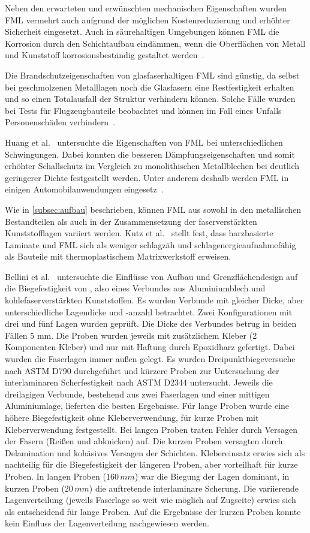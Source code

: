Neben den erwarteten und erwünschten mechanischen Eigenschaften wurden FML vermehrt auch aufgrund der möglichen Kostenreduzierung und erhöhter Sicherheit eingesetzt.
Auch in säurehaltigen Umgebungen können FML die Korrosion durch den Schichtaufbau eindämmen, wenn die Oberflächen von Metall und Kunststoff korrosionsbeständig gestaltet werden~\cite{Vogelesang2000}.

Die Brandschutzeigenschaften von glasfaserhaltigen FML sind günstig, da selbst bei geschmolzenen Metalllagen noch die Glasfasern eine Restfestigkeit erhalten und so einen Totalausfall der Struktur verhindern können.
Solche Fälle wurden bei Tests für Flugzeugbauteile beobachtet und können im Fall eines Unfalls Personenschäden verhindern~\cite{Vogelesang2000}.

Huang et al.~\cite{Huang1995} untersuchte die Eigenschaften von FML bei unterschiedlichen Schwingungen.
Dabei konnten die besseren Dämpfungseigenschaften und somit erhöhter Schallschutz im Vergleich zu monolithischen Metallblechen bei deutlich geringerer Dichte festgestellt werden.
Unter anderem deshalb werden FML in einigen Automobilanwendungen eingesetz~\cite{Ruokolainen2008}.

Wie in \autoref{subsec:aufbau} beschrieben, können FML aus sowohl in den metallischen Bestandteilen als auch in der Zusammensetzung der faserverstärkten Kunststofflagen variiert werden.
Kutz et al.~\cite{Kutz2017} stellt fest, dass harzbasierte Laminate und FML sich als weniger schlagzäh und schlagenergieaufnahmefähig als Bauteile mit thermoplastischem Matrixwerkstoff erweisen.


Bellini et al.~\cite{Bellini2020} untersuchte die Einflüsse von Aufbau und Grenzflächendesign auf die Biegefestigkeit von , also eines Verbundes aus Aluminiumblech und kohlefaserverstärkten Kunststoffen.
Es wurden Verbunde mit gleicher Dicke, aber unterschiedliche Lagendicke und -anzahl betrachtet.
Zwei Konfigurationen mit drei und fünf Lagen wurden geprüft.
Die Dicke des Verbundes betrug in beiden Fällen 5 mm.
Die Proben wurden jeweils mit zusätzlichem Kleber (2 Komponenten Kleber) und nur mit Haftung durch Epoxidharz gefertigt.
Dabei wurden die Faserlagen immer außen gelegt.
Es wurden Dreipunktbiegeversuche nach ASTM D790 durchgeführt und kürzere Proben zur Untersuchung der interlaminaren Scherfestigkeit nach ASTM D2344 untersucht.
Jeweils die dreilagigen Verbunde, bestehend aus zwei Faserlagen und einer mittigen Aluminiumlage, lieferten die besten Ergebnisse.
Für lange Proben wurde eine höhere Biegefestigkeit ohne Kleberverwendung, für kurze Proben mit Kleberverwendung festgestellt.
Bei langen Proben traten Fehler durch Versagen der Fasern (Reißen und abknicken) auf.
Die kurzen Proben versagten durch Delamination und kohäsives Versagen der Schichten.
Klebereinsatz erwies sich als nachteilig für die Biegefestigkeit der längeren Proben, aber vorteilhaft für kurze Proben.
In langen Proben ($160\, mm$)  war die Biegung der Lagen dominant, in kurzen Proben ($20\, mm$) die auftretende interlaminare Scherung.
Die variierende Lagenverteilung (jeweils Faserlage so weit wie möglich auf Zugseite) erwies sich als entscheidend für lange Proben.
Auf die Ergebnisse der kurzen Proben konnte kein Einfluss der Lagenverteilung nachgewiesen werden.



